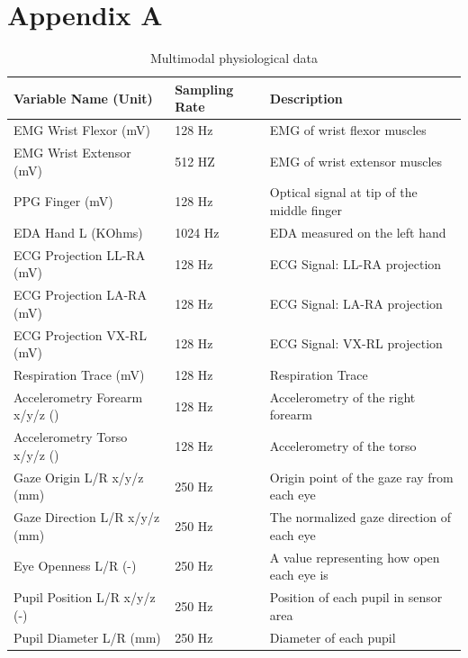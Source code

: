 \documentclass[11pt, a4paper]{article}
\begin{document}


\clearpage
\appendix
{}
\section*{Appendix A} 
\label{app:a}

\begin{table}[htbp]
	\caption{Multimodal physiological data}
	\label{tab:physio}
	\centering
	\small
	\begin{tabular}{lll}
		\toprule                                 	
		Variable Name (Unit)                   &Sampling Rate        		&  Description     \\ 
		\midrule
		EMG Wrist Flexor (mV)  				& 128 Hz         	& EMG of wrist flexor muscles\\
		\midrule
		EMG Wrist Extensor (mV)				& 512 HZ         & EMG of wrist extensor muscles  \\
		\midrule  			
		PPG Finger (mV)				&128 Hz     & Optical signal at tip of the middle finger \\
		\midrule
		EDA Hand L (KOhms)  				& 1024 Hz          		& EDA measured on the left hand \\
		\midrule
		ECG Projection LL-RA (mV)     &128 Hz           		& ECG Signal: LL-RA projection \\
		\midrule
		ECG Projection LA-RA (mV)    &128 Hz          		& ECG Signal: LA-RA projection \\
		\midrule
		ECG Projection VX-RL (mV)    &128 Hz           		& ECG Signal: VX-RL projection \\
		\midrule
		Respiration Trace (mV)    	&128 Hz        		& Respiration Trace \\
		\midrule
		Accelerometry Forearm x/y/z (\text{m/s\textsuperscript{2}})    &128 Hz  & Accelerometry of the right forearm\\
		\midrule
		Accelerometry Torso x/y/z (\text{m/s\textsuperscript{2}})   &128 Hz  & Accelerometry of the torso\\
		\midrule
		Gaze Origin L/R x/y/z (mm)		&250 Hz 		& Origin point of the gaze ray from each eye \\
		\midrule
		Gaze Direction L/R x/y/z (mm)	&250 Hz		& The normalized gaze direction of each eye \\
		\midrule
		Eye Openness L/R (-)			&250 Hz  		& A value representing how open each eye is\\
		\midrule
		Pupil Position L/R x/y/z (-)	&250 Hz  	& Position of each pupil in sensor area\\
		\midrule
		Pupil Diameter L/R (mm)			&250 Hz 		& Diameter of each pupil\\
		\bottomrule	
	\end{tabular}
\end{table}
\end{document}
